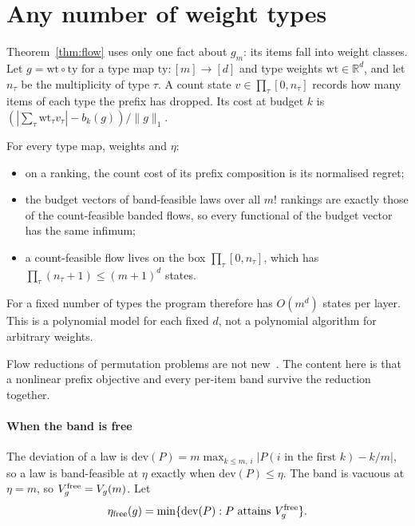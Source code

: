 \section{Any number of weight types}
\label{sec:typed}

Theorem~\ref{thm:flow} uses only one fact about $g_m$: its items fall into weight classes. Let
$g=\mathrm{wt}\circ\mathrm{ty}$ for a type map $\mathrm{ty}:[m]\to[d]$ and type weights
$\mathrm{wt}\in\mathbb R^d$, and let $n_\tau$ be the multiplicity of type $\tau$. A count state
$v\in\prod_\tau[0,n_\tau]$ records how many items of each type the prefix has dropped. Its cost
at budget $k$ is $(|\sum_\tau\mathrm{wt}_\tau v_\tau|-b_k(g))/\|g\|_1$.

\begin{theorem}
\label{thm:typedflow}
For every type map, weights and $\eta$:
\begin{itemize}
\item on a ranking, the count cost of its prefix composition is its normalised regret;
\item the budget vectors of band-feasible laws over all $m!$ rankings are exactly those of the
count-feasible banded flows, so every functional of the budget vector has the same infimum;
\item a count-feasible flow lives on the box $\prod_\tau[0,n_\tau]$, which has
$\prod_\tau(n_\tau+1)\le(m+1)^d$ states.
\end{itemize}
For a fixed number of types the program therefore has $O(m^d)$ states per layer. This is a
polynomial model for each fixed $d$, not a polynomial algorithm for arbitrary weights.
\end{theorem}

Flow reductions of permutation problems are not new~\cite{schrijver2003}. The content here is
that a nonlinear prefix objective and every per-item band survive the reduction together.

\paragraph{When the band is free} The deviation of a law is
$\mathrm{dev}(P)=m\max_{k\le m,\,i}|P(i\text{ in the first }k)-k/m|$, so a law is band-feasible
at $\eta$ exactly when $\mathrm{dev}(P)\le\eta$. The band is vacuous at $\eta=m$, so
$V^{\rm free}_g=V_g(m)$. Let
\[
\eta_{\rm free}(g)=\min\{\mathrm{dev}(P):P\ \text{attains}\ V^{\rm free}_g\}.
\]

